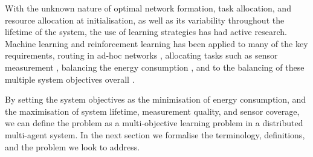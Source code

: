 
With the unknown nature of optimal network formation, task allocation, and resource allocation at initialisation, as well as its variability throughout the lifetime of the system, the use of learning strategies has had active research. Machine learning and reinforcement learning has been applied to many of the key requirements, routing in ad-hoc networks \citep{Nurmi}, allocating tasks such as sensor measurement \citep{doi:10.1155/2014/765182}, balancing the energy consumption \citep{10.1007/978-3-642-11814-2_4, PraveenKumar2019a}, and to the balancing of these multiple system objectives overall \cite{SENGUPTA2013405, s150717572}.

By setting the system objectives as the minimisation of energy consumption, and the maximisation of system lifetime, measurement quality, and sensor coverage, we can define the problem as a multi-objective learning problem in a distributed multi-agent system. In the next section we formalise the terminology, definitions, and the problem we look to address.



